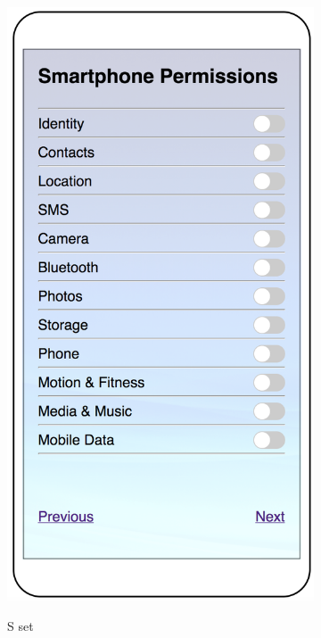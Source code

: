 \begin{figure}
\begin{subfigure}[b]{0.24\textheight}
		\includegraphics[width=0.24\textheight]{figures/manual3.png}
		\label{fig:manualc}
		\caption{S set}
	\end{subfigure}
	\begin{subfigure}[b]{0.24\textheight}

\end{subfigure}
\end{figure}
